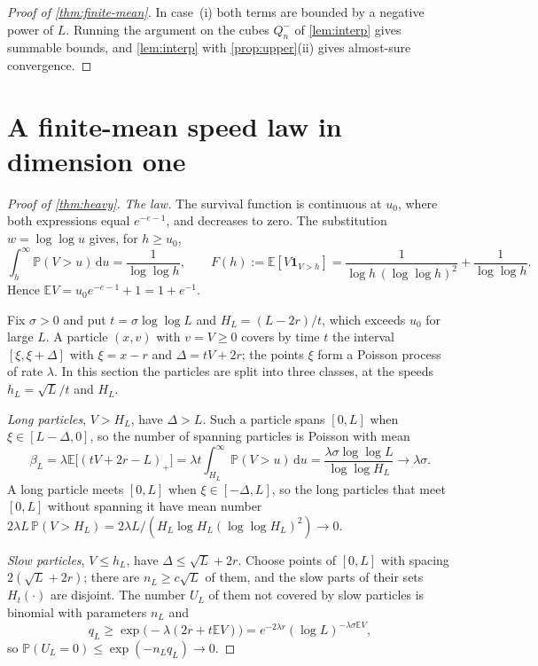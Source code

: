 \documentclass[11pt,a4paper]{article}
\numberwithin{equation}{section}
\theoremstyle{definition}
\theoremstyle{remark}
\newcommand{\E}{\mathbb E}
\newcommand{\Pp}{\mathbb P}
\newcommand{\ind}{\mathbf 1}
\newcommand{\dd}{\,\mathrm d}
\begin{document}
\begin{proof}[Proof of \cref{thm:finite-mean}]
In case~(i) both terms are bounded by a negative power of $L$. Running the
argument on the cubes $Q_n^-$ of \cref{lem:interp} gives summable bounds, and
\cref{lem:interp} with \cref{prop:upper}(ii) gives almost-sure convergence.
\end{proof}

\section{A finite-mean speed law in dimension one}\label{sec:heavy}

\begin{proof}[Proof of \cref{thm:heavy}]
\emph{The law.} The survival function is continuous at $u_0$, where both
expressions equal $e^{-e-1}$, and decreases to zero. The substitution
$w=\log\log u$ gives, for $h\ge u_0$,
\begin{equation}\label{eq:tail-int}
\int_h^\infty\Pp(V>u)\dd u=\frac1{\log\log h},\qquad
F(h):=\E[V\ind_{V>h}]=\frac{1}{\log h\,(\log\log h)^2}+\frac{1}{\log\log h}.
\end{equation}
Hence $\E V=u_0e^{-e-1}+1=1+e^{-1}$.

Fix $\sigma>0$ and put $t=\sigma\log\log L$ and $H_L=(L-2r)/t$, which exceeds
$u_0$ for large $L$. A particle $(x,v)$ with $v=V\ge0$ covers by time $t$ the
interval $[\xi,\xi+\Delta]$ with $\xi=x-r$ and $\Delta=tV+2r$; the points
$\xi$ form a Poisson process of rate $\lambda$. In this section the particles
are split into three classes, at the speeds $h_L=\sqrt L/t$ and $H_L$.

\emph{Long particles}, $V>H_L$, have $\Delta>L$. Such a particle spans $[0,L]$
when $\xi\in[L-\Delta,0]$, so the number of spanning particles is Poisson with
mean
\[
\beta_L=\lambda\E\bigl[(tV+2r-L)_+\bigr]=\lambda t\int_{H_L}^\infty\Pp(V>u)\dd u
=\frac{\lambda\sigma\log\log L}{\log\log H_L}\to\lambda\sigma .
\]
A long particle meets $[0,L]$ when $\xi\in[-\Delta,L]$, so the long particles
that meet $[0,L]$ without spanning it have mean number
$2\lambda L\,\Pp(V>H_L)=2\lambda L/(H_L\log H_L(\log\log H_L)^2)\to0$.

\emph{Slow particles}, $V\le h_L$, have $\Delta\le\sqrt L+2r$. Choose points of
$[0,L]$ with spacing $2(\sqrt L+2r)$; there are $n_L\ge c\sqrt L$ of them, and
the slow parts of their sets $H_t(\cdot)$ are disjoint. The number $U_L$ of
them not covered by slow particles is binomial with parameters $n_L$ and
\[
q_L\ge\exp\bigl(-\lambda(2r+t\E V)\bigr)=e^{-2\lambda r}(\log L)^{-\lambda\sigma\E V},
\]
so $\Pp(U_L=0)\le\exp(-n_Lq_L)\to0$.


\end{proof}
\end{document}
